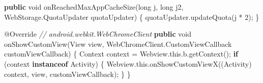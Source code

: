 \documentclass[
]{article}
\newenvironment{Shaded}{}{}
\newcommand{\AttributeTok}[1]{\textcolor[rgb]{0.49,0.56,0.16}{#1}}
\newcommand{\BuiltInTok}[1]{\textcolor[rgb]{0.00,0.50,0.00}{#1}}
\newcommand{\CommentTok}[1]{\textcolor[rgb]{0.38,0.63,0.69}{\textit{#1}}}
\newcommand{\ControlFlowTok}[1]{\textcolor[rgb]{0.00,0.44,0.13}{\textbf{#1}}}
\newcommand{\DataTypeTok}[1]{\textcolor[rgb]{0.56,0.13,0.00}{#1}}
\newcommand{\DecValTok}[1]{\textcolor[rgb]{0.25,0.63,0.44}{#1}}
\newcommand{\FunctionTok}[1]{\textcolor[rgb]{0.02,0.16,0.49}{#1}}
\newcommand{\KeywordTok}[1]{\textcolor[rgb]{0.00,0.44,0.13}{\textbf{#1}}}
\newcommand{\NormalTok}[1]{#1}
\newcommand{\OperatorTok}[1]{\textcolor[rgb]{0.40,0.40,0.40}{#1}}
\begin{document}
\begin{Shaded}
\begin{Highlighting}[]
        \KeywordTok{public} \DataTypeTok{void} \FunctionTok{onReachedMaxAppCacheSize}\OperatorTok{(}\DataTypeTok{long}\NormalTok{ j}\OperatorTok{,} \DataTypeTok{long}\NormalTok{ j2}\OperatorTok{,}\NormalTok{ WebStorage}\OperatorTok{.}\FunctionTok{QuotaUpdater}\NormalTok{ quotaUpdater}\OperatorTok{)} \OperatorTok{\{}
\NormalTok{            quotaUpdater}\OperatorTok{.}\FunctionTok{updateQuota}\OperatorTok{(}\NormalTok{j }\OperatorTok{*} \DecValTok{2}\OperatorTok{);}
        \OperatorTok{\}}

        \AttributeTok{@Override} \CommentTok{// android.webkit.WebChromeClient}
        \KeywordTok{public} \DataTypeTok{void} \FunctionTok{onShowCustomView}\OperatorTok{(}\BuiltInTok{View}\NormalTok{ view}\OperatorTok{,}\NormalTok{ WebChromeClient}\OperatorTok{.}\FunctionTok{CustomViewCallback}\NormalTok{ customViewCallback}\OperatorTok{)} \OperatorTok{\{}
            \BuiltInTok{Context}\NormalTok{ context }\OperatorTok{=}\NormalTok{ Webview}\OperatorTok{.}\FunctionTok{this}\OperatorTok{.}\FunctionTok{b}\OperatorTok{.}\FunctionTok{getContext}\OperatorTok{();}
            \ControlFlowTok{if} \OperatorTok{(}\NormalTok{context }\KeywordTok{instanceof}\NormalTok{ Activity}\OperatorTok{)} \OperatorTok{\{}
\NormalTok{                Webview}\OperatorTok{.}\FunctionTok{this}\OperatorTok{.}\FunctionTok{onShowCustomViewX}\OperatorTok{((}\NormalTok{Activity}\OperatorTok{)}\NormalTok{ context}\OperatorTok{,}\NormalTok{ view}\OperatorTok{,}\NormalTok{ customViewCallback}\OperatorTok{);}
            \OperatorTok{\}}
        \OperatorTok{\}}


\end{Highlighting}
\end{Shaded}
\end{document}
